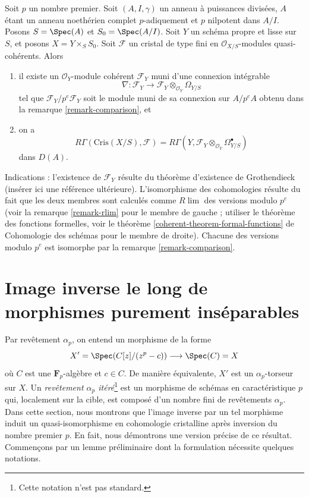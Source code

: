 \begin{remark}
\label{remark-complete-comparison}
Soit $p$ un nombre premier. Soit $(A, I, \gamma)$ un anneau à puissances
divisées, $A$ étant un anneau noethérien complet $p$-adiquement et $p$ nilpotent
dans $A/I$. Posons $S = \Spec(A)$ et
$S_0 = \Spec(A/I)$. Soit $Y$ un schéma propre et lisse sur $S$, et posons
$X = Y \times_S S_0$. Soit $\mathcal{F}$ un cristal de type fini en
$\mathcal{O}_{X/S}$-modules quasi-cohérents. Alors
\begin{enumerate}
\item il existe un $\mathcal{O}_Y$-module cohérent $\mathcal{F}_Y$
muni d'une connexion intégrable
$$
\nabla :
\mathcal{F}_Y
\longrightarrow
\mathcal{F}_Y \otimes_{\mathcal{O}_Y} \Omega_{Y/S}
$$
tel que $\mathcal{F}_Y/p^e\mathcal{F}_Y$ soit le module muni de sa connexion
sur $A/p^eA$ obtenu dans la remarque \ref{remark-comparison}, et
\item on a
$$
R\Gamma(\text{Cris}(X/S), \mathcal{F}) =
R\Gamma(Y, \mathcal{F}_Y \otimes_{\mathcal{O}_Y} \Omega^\bullet_{Y/S})
$$
dans $D(A)$.
\end{enumerate}
Indications : l'existence de $\mathcal{F}_Y$ résulte du théorème d'existence de Grothendieck
(insérer ici une référence ultérieure). L'isomorphisme des cohomologies résulte
du fait que les deux membres sont calculés comme $R\lim$ des versions modulo $p^e$
(voir la remarque \ref{remark-rlim} pour le membre de gauche ; utiliser le théorème
des fonctions formelles, voir le
théorème \ref{coherent-theorem-formal-functions} de Cohomologie des schémas
pour le membre de droite).
Chacune des versions modulo $p^e$ est isomorphe par la
remarque \ref{remark-comparison}.
\end{remark}




\section{Image inverse le long de morphismes purement inséparables}
\label{section-pull-back-along-pth-root}

\noindent
Par revêtement $\alpha_p$, on entend un morphisme de la forme
$$
X' = \Spec(C[z]/(z^p - c)) \longrightarrow \Spec(C) = X
$$
où $C$ est une $\mathbf{F}_p$-algèbre et $c \in C$. De manière équivalente,
$X'$ est un $\alpha_p$-torseur sur $X$. Un {\it revêtement
$\alpha_p$ itéré}\footnote{Cette notation n'est pas standard.}
est un morphisme de schémas en caractéristique
$p$ qui, localement sur la cible, est composé d'un nombre fini de
revêtements $\alpha_p$. Dans cette section, nous montrons que l'image inverse par
un tel morphisme induit un quasi-isomorphisme en cohomologie cristalline
après inversion du nombre premier $p$. En fait, nous démontrons une version précise
de ce résultat. Commençons par un lemme préliminaire dont la formulation
nécessite quelques notations.

